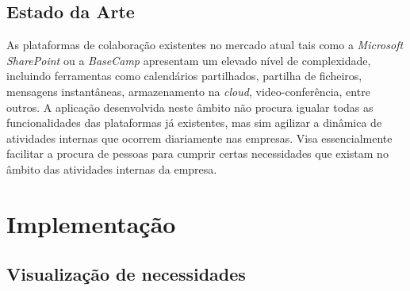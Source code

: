 \documentclass[a4paper,openright,11pt]{report}
\begin{document}
\subsection*{Estado da Arte}
As plataformas de colaboração existentes no mercado atual tais como a \textit{Microsoft SharePoint} ou a \textit{BaseCamp} apresentam um elevado nível de complexidade, incluindo ferramentas como calendários partilhados, partilha de ficheiros, mensagens instantâneas, armazenamento na \textit{cloud}, video-conferência, entre outros. A aplicação desenvolvida neste âmbito não procura igualar todas as funcionalidades das plataformas já existentes, mas sim agilizar a dinâmica de atividades internas que ocorrem diariamente nas empresas. Visa essencialmente facilitar a procura de pessoas para cumprir certas necessidades que existam no âmbito das atividades internas da empresa.

\section*{Implementação}

\subsection*{Visualização de necessidades}\label{sec:necessities}
\end{document}
